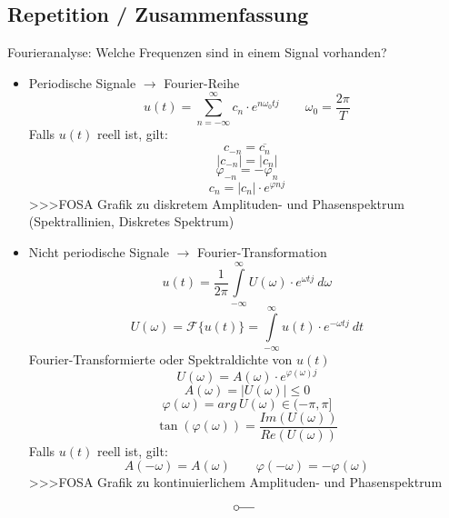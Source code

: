 \subsection{Repetition / Zusammenfassung}
Fourieranalyse: Welche Frequenzen sind in einem Signal vorhanden? 
\begin{itemize}
  \item Periodische Signale $\to$ Fourier-Reihe
        \[ u(t) = \sum\limits_{n = -\infty}^{\infty} c_n \cdot e^{n \omega_0 t j} 
        \qquad \omega_0 = \frac{2 \pi}{T} \]
        Falls $u(t)$ reell ist, gilt: 
        \[ c_{-n} = \overline{c_n} \]
        \[ |c_{-n}| = |c_n| \]
        \[ \varphi_{-n} = - \varphi_n \]
        \[ c_n = |c_n| \cdot e^{\varphi n j} \]
        >>>FOSA Grafik zu diskretem Amplituden- und Phasenspektrum
                (Spektrallinien, Diskretes Spektrum)
  \item Nicht periodische Signale $\to$ Fourier-Transformation
        \[ u(t) = \frac{1}{2 \pi} \int\limits_{-\infty}^{\infty} U(\omega) 
        \cdot e^{\omega t j} ~ d\omega \]
        \[ U(\omega) = \mathcal{F}\{ u(t) \} =  \int\limits_{-\infty}^{\infty} 
        u(t) \cdot e^{-\omega t j} ~ dt \]
        Fourier-Transformierte oder Spektraldichte von $u(t)$
        \[ U(\omega) = A(\omega) \cdot e^{\varphi(\omega) j} \]
        \[ A(\omega) = |U(\omega)| \leq 0 \]
        \[ \varphi(\omega) = arg ~ U(\omega) \in (-\pi , \pi \rbrack \]
        \[ \tan(\varphi(\omega)) = \frac{Im(U(\omega))}{Re(U(\omega))} \]
        Falls $u(t)$ reell ist, gilt: 
        \[ A(-\omega) = A(\omega) \qquad \varphi(-\omega) = -\varphi(\omega) \]
        >>>FOSA Grafik zu kontinuierlichem Amplituden- und Phasenspektrum
        \[ \fourier \]
\end{itemize}
